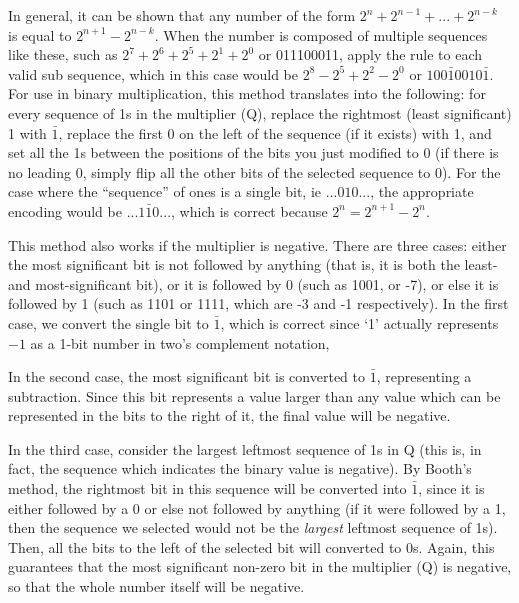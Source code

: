 \documentclass{article}
\begin{document}
    In general, it can be shown that any number of the form $2^n + 2^{n-1} + ...
+ 2^{n-k}$ is equal to $2^{n+1} - 2^{n-k}$.
When the number is composed of multiple sequences like these, such as $2^7 + 2^6 + 2^5 + 2^1 + 2^0$ or 011100011, apply the rule to each valid sub sequence, which in this case would be $2^8 - 2^5 + 2^2 - 2^0$ or $100\bar{1}0010\bar{1}$.
For use in binary multiplication, this method translates into the following: for every sequence of 1s in the multiplier (Q), replace the rightmost (least significant) 1 with $\bar{1}$, replace the first 0 on the left of the sequence (if it exists) with 1, and set all the 1s between the positions of the bits you just modified to 0 (if there is no leading 0, simply flip all the other bits of the selected sequence to 0).
For the case where the ``sequence'' of ones is a single bit, ie $...010...$,
the appropriate encoding would be $...1\bar{1}0...$,
which is correct because $2^n = 2^{n+1} - 2^n$.

This method also works if the multiplier is negative.
There are three cases: either the most significant bit is not followed by anything (that is, it is both the least- and most-significant bit), or it is followed by 0 (such as 1001, or -7), or else it is followed by 1 (such as 1101 or 1111, which are -3 and -1 respectively).
In the first case, we convert the single bit to $\bar{1}$, which is correct since `1' actually represents $-1$ as a 1-bit number in two's complement notation, 

In the second case, the most significant bit is converted to $\bar{1}$, representing a subtraction.
Since this bit represents a value larger than any value which can be represented in the bits to the right of it, the final value will be negative.

In the third case, consider the largest leftmost sequence of 1s in Q (this is, in fact, the sequence which indicates the binary value is negative).
By Booth's method, the rightmost bit in this sequence will be converted into $\bar{1}$, since it is either followed by a 0 or else not followed by anything (if it were followed by a 1, then the sequence we selected would not be the \emph{largest} leftmost sequence of 1s).
Then, all the bits to the left of the selected bit will converted to 0s.
Again, this guarantees that the most significant non-zero bit in the multiplier (Q) is negative, so that the whole number itself will be negative.
\end{document}
